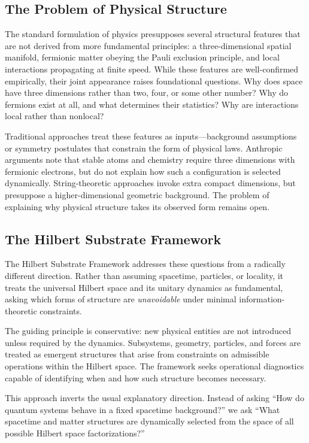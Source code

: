 \documentclass[11pt]{article}
\begin{document}
\subsection{The Problem of Physical Structure}

The standard formulation of physics presupposes several structural features that are not derived from more fundamental principles: a three-dimensional spatial manifold, fermionic matter obeying the Pauli exclusion principle, and local interactions propagating at finite speed. While these features are well-confirmed empirically, their joint appearance raises foundational questions. Why does space have three dimensions rather than two, four, or some other number? Why do fermions exist at all, and what determines their statistics? Why are interactions local rather than nonlocal?

Traditional approaches treat these features as inputs---background assumptions or symmetry postulates that constrain the form of physical laws. Anthropic arguments note that stable atoms and chemistry require three dimensions with fermionic electrons, but do not explain how such a configuration is selected dynamically. String-theoretic approaches invoke extra compact dimensions, but presuppose a higher-dimensional geometric background. The problem of explaining why physical structure takes its observed form remains open.

\subsection{The Hilbert Substrate Framework}

The Hilbert Substrate Framework addresses these questions from a radically different direction. Rather than assuming spacetime, particles, or locality, it treats the universal Hilbert space and its unitary dynamics as fundamental, asking which forms of structure are \emph{unavoidable} under minimal information-theoretic constraints.

The guiding principle is conservative: new physical entities are not introduced unless required by the dynamics. Subsystems, geometry, particles, and forces are treated as emergent structures that arise from constraints on admissible operations within the Hilbert space. The framework seeks operational diagnostics capable of identifying when and how such structure becomes necessary.

This approach inverts the usual explanatory direction. Instead of asking ``How do quantum systems behave in a fixed spacetime background?'' we ask ``What spacetime and matter structures are dynamically selected from the space of all possible Hilbert space factorizations?''
\end{document}
